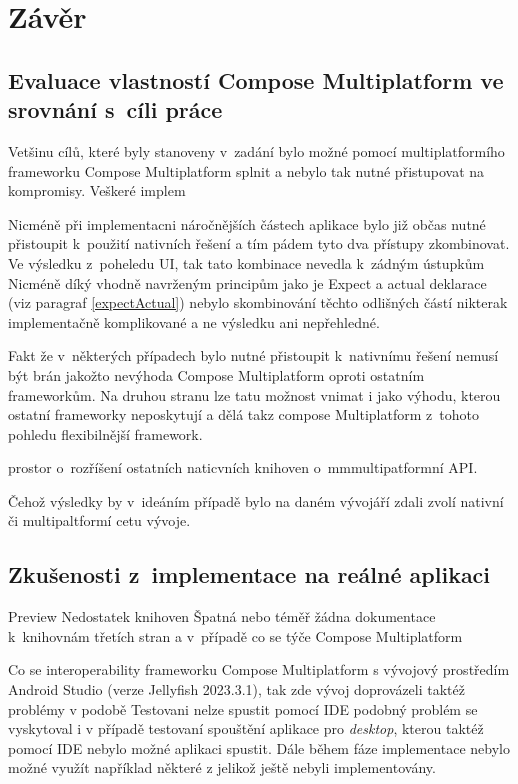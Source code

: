 \chapter{Závěr}

\section{Evaluace vlastností Compose Multiplatform ve srovnání s~cíli práce}
Vetšinu cílů, které byly stanoveny v~zadání bylo možné pomocí multiplatformího frameworku Compose Multiplatform splnit a nebylo tak
nutné přistupovat na kompromisy. Veškeré implem

Nicméně při implementacni náročnějších částech aplikace bylo již občas nutné přistoupit k~použití nativních řešení a tím pádem tyto dva přístupy zkombinovat.
Ve výsledku z~poheledu UI, tak tato kombinace nevedla k~zádným ústupkům
Nicméně díký vhodně navrženým principům jako je Expect a actual deklarace (viz paragraf \ref{expectActual}) nebylo skombinování těchto odlišných částí nikterak
implementačně komplikované a ne výsledku ani nepřehledné. 

Fakt že v~některých případech bylo nutné přistoupit k~nativnímu řešení nemusí být brán jakožto nevýhoda Compose Multiplatform oproti ostatním frameworkům.
Na druhou stranu lze tatu možnost vnimat i jako výhodu, kterou ostatní frameworky neposkytují a dělá takz compose Multiplatform z~tohoto pohledu flexibilnější
framework.

prostor o~rozříšení ostatních naticvních knihoven o~mmmultipatformní API. 

Čehož výsledky by v~ideáním případě bylo na daném vývojáří zdali zvolí nativní či multipaltformí cetu vývoje. 

\section{Zkušenosti z~implementace na reálné aplikaci}
Preview
Nedostatek knihoven
Špatná nebo téměř žádna dokumentace k~knihovnám třetích stran a v~případě co se týče Compose Multiplatform

Co se interoperability frameworku Compose Multiplatform s vývojový prostředím Android Studio (verze Jellyfish 2023.3.1), tak zde vývoj doprovázeli 
taktéž problémy v podobě 
Testovani nelze spustit pomocí IDE podobný problém se vyskytoval i v případě testovaní spouštění aplikace pro \textit{desktop}, kterou taktéž pomocí
IDE nebylo možné aplikaci spustit.
Dále během fáze implementace nebylo možné využít například některé z  jelikož ještě nebyli implementovány.


